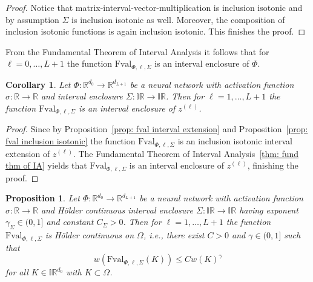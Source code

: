 \documentclass[a4paper, 11pt]{article}
\newtheorem{proposition}[theorem]{Proposition}
\newtheorem{corollary}[theorem]{Corollary}
\begin{document}
	\begin{proof}
		Notice that matrix-interval-vector-multiplication is inclusion isotonic and by assumption $\Sigma$ is inclusion isotonic as well. Moreover, the composition of inclusion isotonic functions is again inclusion isotonic. This finishes the proof.
	\end{proof}
	
	From the Fundamental Theorem of Interval Analysis it follows that for $\ell=0,\dotsc,L+1$ the function $\mathrm{Fval}_{\Phi, \ell, \Sigma}$ is an interval enclosure of $\Phi$.
	
	\begin{corollary}\label{cor: fval int encl}
		Let $\Phi : \mathbb{R}^{d_0} \to \mathbb{R}^{d_{L+1}}$ be a neural network with activation function $\sigma : \mathbb{R} \to \mathbb{R}$ and interval enclosure $\Sigma:\mathbb{IR}\to \mathbb{IR}$. Then for $\ell=1,\dotsc,L+1$ the function $\mathrm{Fval}_{\Phi, \ell, \Sigma}$ is an interval enclosure of $z^{(\ell)}$.
	\end{corollary}
	\begin{proof}
		Since by Proposition~\ref{prop: fval interval extension} and Proposition~\ref{prop: fval inclusion isotonic} the function $\mathrm{Fval}_{\Phi, \ell, \Sigma}$ is an inclusion isotonic interval extension of $z^{(\ell)}$. The Fundamental Theorem of Interval Analysis~\ref{thm: fund thm of IA} yields that $\mathrm{Fval}_{\Phi, \ell, \Sigma}$ is an interval enclosure of $z^{(\ell)}$, finishing the proof.
	\end{proof}
	
	
	
	\begin{proposition}\label{prop: fval hölder}
		Let $\Phi : \mathbb{R}^{d_0} \to \mathbb{R}^{d_{L+1}}$ be a neural network with activation function $\sigma : \mathbb{R} \to \mathbb{R}$ and Hölder continuous interval enclosure $\Sigma:\mathbb{IR}\to \mathbb{IR}$ having exponent $\gamma_\Sigma \in (0,1]$ and constant $C_\Sigma > 0$. Then for $\ell=1,\dotsc,L+1$ the function $\mathrm{Fval}_{\Phi, \ell, \Sigma}$ is Hölder continuous on $\Omega$, i.e., there exist $C > 0$ and $\gamma \in (0,1]$ such that
		$$ w(\mathrm{Fval}_{\Phi, \ell, \Sigma}(K)) \leq C w(K)^{\gamma} $$
		for all $K \in \mathbb{IR}^{d_0}$ with $K \subset \Omega$.
	\end{proposition}
	
\end{document}
